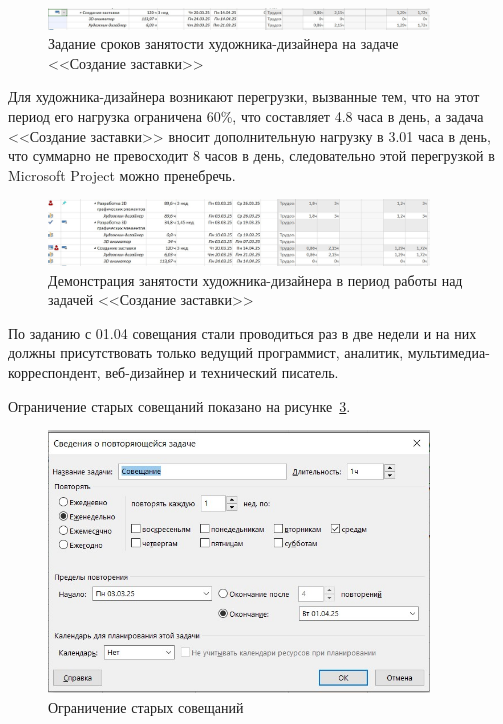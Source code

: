 \begin{figure}[H]
	\centering
	\includegraphics[width=0.9\textwidth]{img/screen10_1.jpg}
	\caption{Задание сроков занятости художника-дизайнера на задаче <<Создание заставки>>}
	\label{fig:screen10_1}
\end{figure}

Для художника-дизайнера возникают перегрузки, вызванные тем, что на этот период его нагрузка ограничена 60\%, что составляет 4.8 часа в день, а задача <<Создание заставки>> вносит дополнительную нагрузку в 3.01 часа в день, что суммарно не превосходит 8 часов в день, следовательно этой перегрузкой в Microsoft Project можно пренебречь.

\begin{figure}[H]
	\centering
	\includegraphics[width=0.9\textwidth]{img/screen16.jpg}
	\caption{Демонстрация занятости художника-дизайнера в период работы над задачей <<Создание заставки>>}
	\label{fig:screen16}
\end{figure}

По заданию с 01.04 совещания стали проводиться раз в две недели и на них должны присутствовать только ведущий программист, аналитик, мультимедиа-корреспондент, веб-дизайнер и технический писатель.

Ограничение старых совещаний показано на рисунке~\ref{fig:screen11}.

\begin{figure}[H]
	\centering
	\includegraphics[width=0.9\textwidth]{img/screen11.jpg}
	\caption{Ограничение старых совещаний}
	\label{fig:screen11}
\end{figure}

